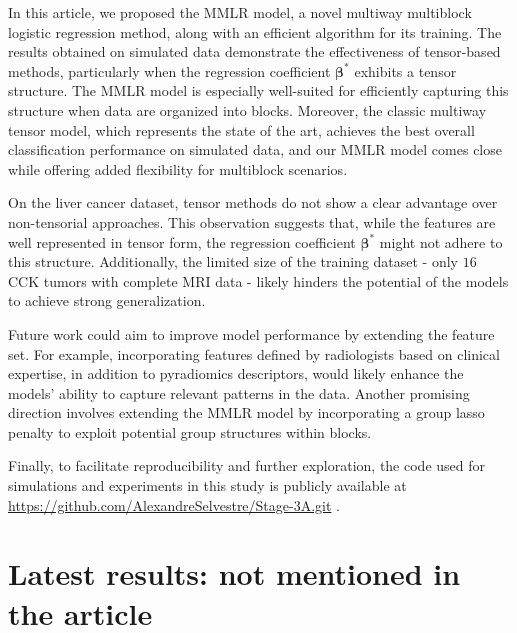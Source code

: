 \documentclass[preprint,12pt]{elsarticle}
\begin{document}
\noindent In this article, we proposed the MMLR model, a novel multiway multiblock logistic regression method, along with an efficient algorithm for its training. The results obtained on simulated data demonstrate the effectiveness of tensor-based methods, particularly when the regression coefficient $\bm{\beta}^*$ exhibits a tensor structure. The MMLR model is especially well-suited for efficiently capturing this structure when data are organized into blocks. Moreover, the classic multiway tensor model, which represents the state of the art, achieves the best overall classification performance on simulated data, and our MMLR model comes close while offering added flexibility for multiblock scenarios.

On the liver cancer dataset, tensor methods do not show a clear advantage over non-tensorial approaches. This observation suggests that, while the features are well represented in tensor form, the regression coefficient $\bm{\beta}^*$ might not adhere to this structure. Additionally, the limited size of the training dataset - only $16$ CCK tumors with complete MRI data - likely hinders the potential of the models to achieve strong generalization.

Future work could aim to improve model performance by extending the feature set. For example, incorporating features defined by radiologists based on clinical expertise, in addition to pyradiomics descriptors, would likely enhance the models’ ability to capture relevant patterns in the data. Another promising direction involves extending the MMLR model by incorporating a group lasso penalty to exploit potential group structures within blocks.

Finally, to facilitate reproducibility and further exploration, the code used for simulations and experiments in this study is publicly available at \url{https://github.com/AlexandreSelvestre/Stage-3A.git} .

\newpage

\section{Latest results: not mentioned in the article}
\end{document}

